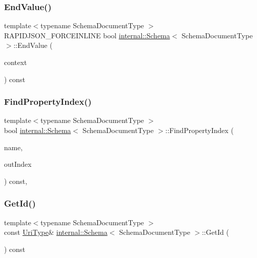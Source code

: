 \subsubsection{\texorpdfstring{End\+Value()}{EndValue()}}
{\footnotesize\ttfamily template$<$typename Schema\+Document\+Type $>$ \\
R\+A\+P\+I\+D\+J\+S\+O\+N\+\_\+\+F\+O\+R\+C\+E\+I\+N\+L\+I\+NE bool \hyperlink{classinternal_1_1Schema}{internal\+::\+Schema}$<$ Schema\+Document\+Type $>$\+::End\+Value (\begin{DoxyParamCaption}\item[{\hyperlink{classinternal_1_1Schema_ac3f54abfefe300c5610c1205869cfd66}{Context} \&}]{context }\end{DoxyParamCaption}) const\hspace{0.3cm}{\ttfamily [inline]}}

\mbox{\label{classinternal_1_1Schema_a25af17593efefc57468dad9daee0c26a}} 
\subsubsection{\texorpdfstring{Find\+Property\+Index()}{FindPropertyIndex()}}
{\footnotesize\ttfamily template$<$typename Schema\+Document\+Type $>$ \\
bool \hyperlink{classinternal_1_1Schema}{internal\+::\+Schema}$<$ Schema\+Document\+Type $>$\+::Find\+Property\+Index (\begin{DoxyParamCaption}\item[{const \hyperlink{classinternal_1_1Schema_a8976b6d7e2a885483d0b51d941019340}{Value\+Type} \&}]{name,  }\item[{\hyperlink{rapidjson_8h_a5ed6e6e67250fadbd041127e6386dcb5}{Size\+Type} $\ast$}]{out\+Index }\end{DoxyParamCaption}) const\hspace{0.3cm}{\ttfamily [inline]}, {\ttfamily [private]}}

\mbox{\label{classinternal_1_1Schema_a17a88cfe3a40ff8476336697813e2e00}} 
\subsubsection{\texorpdfstring{Get\+Id()}{GetId()}}
{\footnotesize\ttfamily template$<$typename Schema\+Document\+Type $>$ \\
const \hyperlink{classinternal_1_1Schema_a3b6cd85c3eeebe870cf8017d9d131d35}{Uri\+Type}\& \hyperlink{classinternal_1_1Schema}{internal\+::\+Schema}$<$ Schema\+Document\+Type $>$\+::Get\+Id (\begin{DoxyParamCaption}{ }\end{DoxyParamCaption}) const\hspace{0.3cm}{\ttfamily [inline]}}

